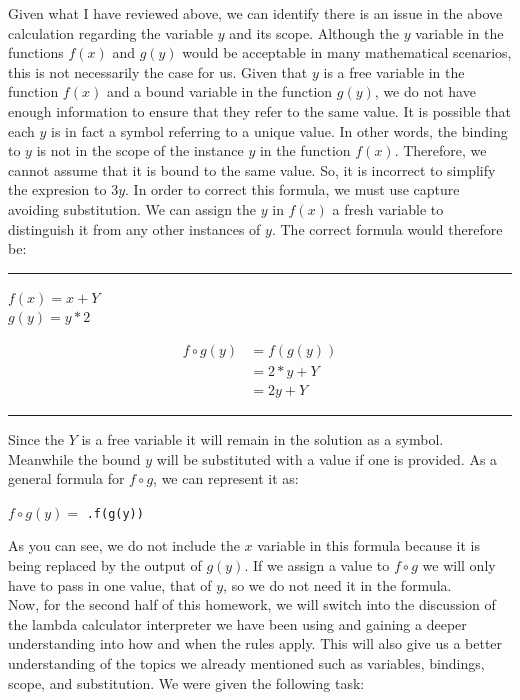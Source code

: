 \documentclass{article}
\theoremstyle{theorem}
\theoremstyle{definition}
\theoremstyle{remark}
\begin{document}
Given what I have reviewed above, we can identify there is an issue in the above calculation regarding the variable $y$ and its scope. Although the $y$ variable in the functions $f(x)$ and $g(y)$ would be acceptable in many mathematical scenarios, this is 
not necessarily the case for us. Given that $y$ is a free variable in the function $f(x)$ and a bound variable in the function $g(y)$, we do not have enough information to ensure that they refer to the same value. It is possible that each $y$ is in fact a symbol referring to 
a unique value. In other words, the binding to $y$ is not in the scope of the instance $y$ in the function $f(x)$. Therefore, we cannot assume that it is bound to the same value. So, it is incorrect to simplify the expresion to $3y$. In order to correct this formula, 
we must use capture avoiding substitution. We can assign the $y$ in $f(x)$ a fresh variable to distinguish it from any other instances of $y$. The correct formula would therefore be: \\

\noindent
  {\color{gray} \rule{\linewidth}{0.05mm}}
\begin{center}
  $f(x) = x + Y$\\
  $g(y) = y * 2$

  \begin{align*}
    f \circ g(y) & = f(g(y)) \\
                & = 2 * y + Y \\
                & = 2y + Y
  \end{align*}
\end{center}
\noindent
  {\color{gray} \rule{\linewidth}{0.05mm}}

Since the $Y$ is a free variable it will remain in the solution as a symbol. Meanwhile the bound $y$ will be substituted with a value if one is provided. As a general formula for $f \circ g$, we can represent it as: 

\begin{center}
  $f \circ g(y) = $ \texttt{\y.f(g(y))}
\end{center} 

As you can see, we do not include the $x$ variable in this formula because it is being replaced by the output of $g(y)$. If we assign a value to $f \circ g$ we will only have to pass in one value, that of $y$, so we do not need it in the formula. \\



Now, for the second half of this homework, we will switch into the discussion of the lambda calculator interpreter we have been using and gaining a deeper understanding into how and when the rules apply. This will also give us a better understanding of the topics we already 
mentioned such as variables, bindings, scope, and substitution. We were given the following task:\\
\end{document}
